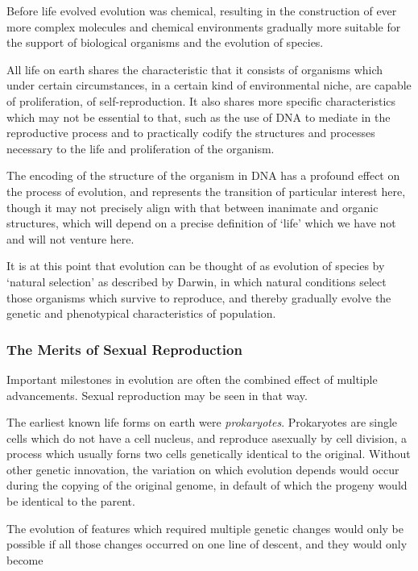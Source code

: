 \documentclass[10pt,titlepage]{book}
\begin{document}
Before life evolved evolution was chemical, resulting in the construction of ever more complex molecules and chemical environments gradually more suitable for the support of biological organisms and the evolution of species.

All life on earth shares the characteristic that it consists of organisms which under certain circumstances, in a certain kind of environmental niche, are capable of proliferation, of self-reproduction.
It also shares more specific characteristics which may not be essential to that, such as the use of DNA to mediate in the reproductive process and to practically codify the structures and processes necessary to the life and proliferation of the organism.

The encoding of the structure of the organism in DNA has a profound effect on the process of evolution, and represents the transition of particular interest here, though it may not precisely align with that between inanimate and organic structures, which will depend on a precise definition of `life' which we have not and will not venture here.

It is at this point that evolution can be thought of as evolution of species by `natural selection' as described by Darwin, in which natural conditions select those organisms which survive to reproduce, and thereby gradually evolve the genetic and phenotypical characteristics of population.

\subsubsection{The Merits of Sexual Reproduction}

Important milestones in evolution are often the combined effect of multiple advancements.
Sexual reproduction may be seen in that way.

The earliest known life forms on earth were \emph{prokaryotes}.
Prokaryotes are single cells which do not have a cell nucleus, and reproduce asexually by cell division, a process which usually forns two cells genetically identical to the original.
Without other genetic innovation, the variation on which evolution depends would occur during the copying of the original genome, in default of which the progeny would be identical to the parent.

The evolution of features which required multiple genetic changes would only be possible if all those changes occurred on one line of descent, and they would only become
\end{document}

